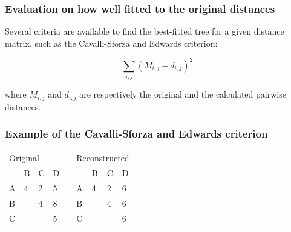 %
%
\subsubsection*{Evaluation on how well fitted to the original distances}
Several criteria are available to find the best-fitted tree for a given distance matrix, such as the Cavalli-Sforza and Edwards criterion:

\[
\sum_{i,j}{}(M_{i,j} - d_{i,j})^2
\]

where $M_{i,j}$ and $d_{i,j}$ are respectively the original and the calculated pairwise distances.

%
%
\subsubsection*{Example of the Cavalli-Sforza and Edwards criterion}

\begin{table}[H]
\centering
\begin{tabular}{lllllllll}
\multicolumn{4}{l}{Original}                                                                       &                       & \multicolumn{4}{l}{Reconstructed}                                                                 \\ \cline{1-4} \cline{6-9} 
\multicolumn{1}{|l|}{}  & \multicolumn{1}{l|}{B} & \multicolumn{1}{l|}{C} & \multicolumn{1}{l|}{D} & \multicolumn{1}{l|}{} & \multicolumn{1}{l|}{}  & \multicolumn{1}{l|}{B} & \multicolumn{1}{l|}{C} & \multicolumn{1}{l|}{D} \\ \cline{1-4} \cline{6-9} 
\multicolumn{1}{|l|}{A} & \multicolumn{1}{l|}{4} & \multicolumn{1}{l|}{2} & \multicolumn{1}{l|}{5} & \multicolumn{1}{l|}{} & \multicolumn{1}{l|}{A} & \multicolumn{1}{l|}{4} & \multicolumn{1}{l|}{2} & \multicolumn{1}{l|}{6} \\ \cline{1-4} \cline{6-9} 
\multicolumn{1}{|l|}{B} & \multicolumn{1}{l|}{}  & \multicolumn{1}{l|}{4} & \multicolumn{1}{l|}{8} & \multicolumn{1}{l|}{} & \multicolumn{1}{l|}{B} & \multicolumn{1}{l|}{}  & \multicolumn{1}{l|}{4} & \multicolumn{1}{l|}{6} \\ \cline{1-4} \cline{6-9} 
\multicolumn{1}{|l|}{C} & \multicolumn{1}{l|}{}  & \multicolumn{1}{l|}{}  & \multicolumn{1}{l|}{5} & \multicolumn{1}{l|}{} & \multicolumn{1}{l|}{C} & \multicolumn{1}{l|}{}  & \multicolumn{1}{l|}{}  & \multicolumn{1}{l|}{6} \\ \cline{1-4} \cline{6-9} 
\end{tabular}
\end{table}

